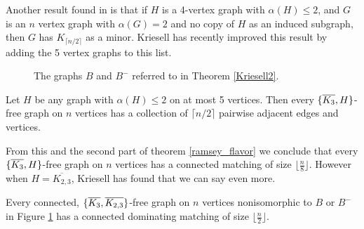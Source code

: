 Another result found in \cite{PST} is that if $H$ is a 4-vertex graph with $\alpha(H) \leq 2$, and $G$ is an $n$ vertex graph with $\alpha(G) =2$ and no copy of $H$ as an induced subgraph, then $G$ has $K_{\lceil n/2 \rceil}$ as a minor.  Kriesell has recently \cite{Kries_1} improved this result by adding the 5 vertex graphs to this list.
\begin{figure}
	\begin{center}
	\hspace{1.5cm}
	
	\end{center}
	\caption{The graphs $B$ and $B^-$ referred to in Theorem \ref{Kriesell2}.}
	\label{B_B}
\end{figure}
\begin{theorem}
	Let $H$ be any graph with $\alpha(H) \leq 2$ on at most 5 vertices.  Then every $\{\overline{K_3}, H\}$-free graph on $n$ vertices has a collection of $\lceil n/2 \rceil$ pairwise adjacent edges and vertices.
	\end{theorem}
From this and the second part of theorem  \ref{ramsey_flavor} we conclude that every $\{\overline{K_3}, H\}$-free graph on $n$ vertices has a connected matching of size $\lfloor \frac{n}{8} \rfloor$. However when $H = \overline{K_{2,3}}$, Kriesell has found that we can say even more.
\begin{theorem}
	Every connected, $\{\overline{K_3}, \overline{K_{2,3}}\}$-free graph on $n$ vertices nonisomorphic to $B$ or $B^-$ in Figure \ref{B_B} has a connected dominating matching of size $\lfloor \frac{n}{2} \rfloor$.\label{Kriesell2}
\end{theorem}


